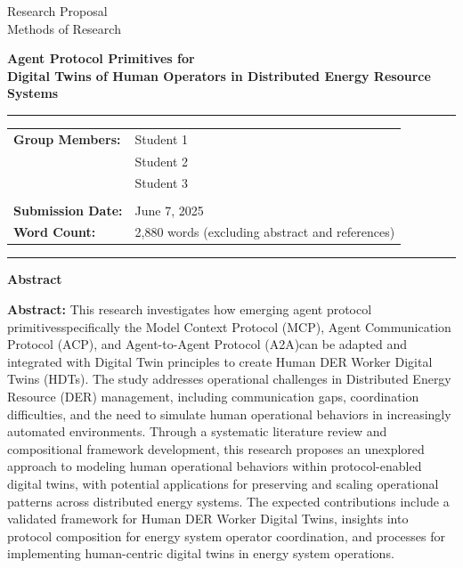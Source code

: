 \documentclass[12pt,a4paper]{article}
\newcommand{\studentone}{Student 1}
\newcommand{\studenttwo}{Student 2}
\newcommand{\studentthree}{Student 3}
\newcommand{\projecttitle}{Agent Protocol Primitives for \\Digital Twins of Human Operators in Distributed Energy Resource Systems}
\newcommand{\submissiondate}{June 7, 2025}
\newcommand{\emdash}{\textemdash}
\begin{document}
\begin{titlepage}
\begin{center}
{\Huge Research Proposal} \\
\vspace{5mm}
{\Large Methods of Research} \\

\vspace{10mm}

{\huge\textbf{\projecttitle}} \\

\vspace{15mm}

\hrule
\vspace{3mm}
\begin{tabular}{ll}
\textbf{Group Members:} & {\studentone} \\
& {\studenttwo} \\
& {\studentthree} \\
\\
\textbf{Submission Date:} & {\submissiondate} \\
\textbf{Word Count:} & 2,880 words (excluding abstract and references) \\
\end{tabular}
\vspace{3mm}
\hrule

\vspace{15mm}

\textbf{Abstract} \\
\vspace{2mm}
\begin{minipage}{0.8\textwidth}
\textbf{Abstract:} This research investigates how emerging agent protocol primitives\emdash specifically the Model Context Protocol (MCP), Agent Communication Protocol (ACP), and Agent-to-Agent Protocol (A2A)\emdash can be adapted and integrated with Digital Twin principles to create Human DER Worker Digital Twins (HDTs). The study addresses operational challenges in Distributed Energy Resource (DER) management, including communication gaps, coordination difficulties, and the need to simulate human operational behaviors in increasingly automated environments. Through a systematic literature review and compositional framework development, this research proposes an unexplored approach to modeling human operational behaviors within protocol-enabled digital twins, with potential applications for preserving and scaling operational patterns across distributed energy systems. The expected contributions include a validated framework for Human DER Worker Digital Twins, insights into protocol composition for energy system operator coordination, and processes for implementing human-centric digital twins in energy system operations.
\end{minipage}

\end{center}
\end{titlepage}
\end{document}
